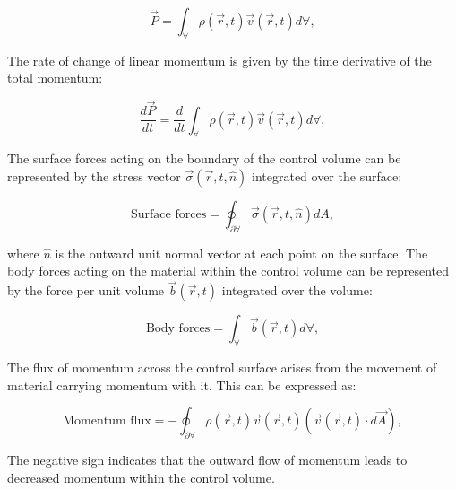 \documentclass[12pt,a4paper,english]{article}
\begin{document}
\begin{equation}
\vec{P} = \int_{\forall} \rho(\vec{r}, t) \vec{v}(\vec{r}, t) d\forall,
\end{equation}

\noindent
The rate of change of linear momentum is given by the time derivative of the total momentum:

\begin{equation}
\frac{d\vec{P}}{dt} = \frac{d}{dt} \int_{\forall} \rho(\vec{r}, t) \vec{v}(\vec{r}, t) d\forall,
\end{equation}

\noindent
The surface forces acting on the boundary of the control volume can be represented by the stress vector $\vec{\sigma}(\vec{r}, t, \hat{n})$ integrated over the surface:

\begin{equation}
\text{Surface forces} = \oint_{\partial \forall} \vec{\sigma}(\vec{r}, t, \hat{n}) dA,
\end{equation}

\noindent
where $\hat{n}$ is the outward unit normal vector at each point on the surface. The body forces acting on the material within the control volume can be represented by the force per unit volume $\vec{b}(\vec{r}, t)$ integrated over the volume:

\begin{equation}
\text{Body forces} = \int_{\forall} \vec{b}(\vec{r}, t) d\forall,
\end{equation}

\noindent


\noindent
The flux of momentum across the control surface arises from the movement of material carrying momentum with it. This can be expressed as:

\begin{equation}
\text{Momentum flux} = - \oint_{\partial \forall} \rho(\vec{r}, t) \vec{v}(\vec{r}, t) (\vec{v}(\vec{r}, t) \cdot d\vec{A}),
\end{equation}

The negative sign indicates that the outward flow of momentum leads to decreased momentum within the control volume.
\end{document}
